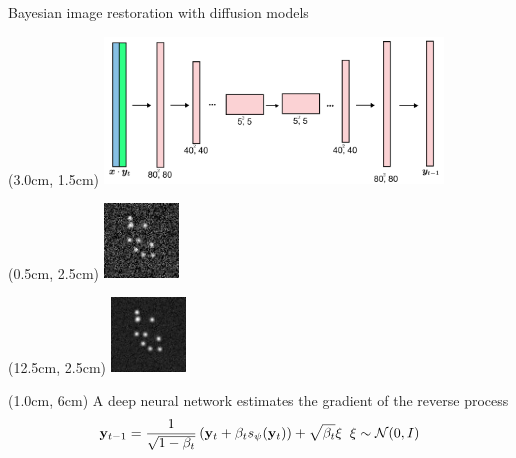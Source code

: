 \documentclass{beamer}					%
\begin{document}
\begin{frame}{Bayesian image restoration with diffusion models}
\begin{textblock*}{9cm}(3.0cm, 1.5cm)
\includegraphics[width=9cm]{../../ddpm/ddpm/media/DiffusionArch.png}
\end{textblock*}
\begin{textblock*}{2cm}(0.5cm, 2.5cm)
\includegraphics[width=2cm]{../../dissertation/dissertation/media/diffusion_example/0_1_sr_79.png}
\end{textblock*}
\begin{textblock*}{2cm}(12.5cm, 2.5cm)
\includegraphics[width=2cm]{../../dissertation/dissertation/media/diffusion_example/0_1_sr_99.png}
\end{textblock*}

\begin{textblock*}{13cm}(1.0cm, 6cm)
A deep neural network estimates the gradient of the reverse process
\begin{equation*}
\bold{y}_{t-1} = \frac{1}{\sqrt{1-\beta_{t}}}\left(\bold{y}_{t} + \beta_{t}s_{\psi}(\bold{y}_{t})\right) + \sqrt{\beta_{t}}\xi \;\; \xi \sim \mathcal{N}(0,I)
\end{equation*}
\end{textblock*}
\end{frame}
\end{document}
